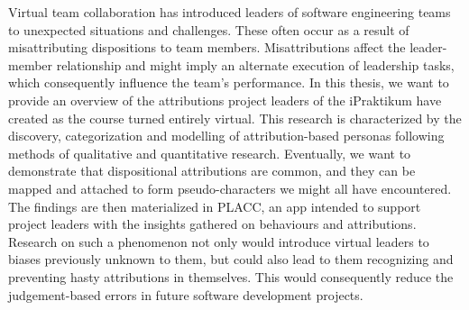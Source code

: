 Virtual team collaboration has introduced leaders of software engineering teams to unexpected situations and challenges.  These often occur as a result of misattributing dispositions to team members.  Misattributions affect the leader-member relationship and might imply an alternate execution of leadership tasks, which consequently influence the team's performance.   In this thesis, we want to provide an overview of the attributions project leaders of the iPraktikum have created as the course turned entirely virtual.   This research is characterized by the discovery, categorization and modelling of attribution-based personas following methods of qualitative and quantitative research. Eventually, we want to demonstrate that dispositional attributions are common, and they can be mapped and attached to form pseudo-characters we might all have encountered.  The findings are then materialized in PLACC,  an app intended to support project leaders with the insights gathered on behaviours and attributions.  Research on such a phenomenon not only would introduce virtual leaders to biases previously unknown to them, but could also lead to them recognizing and preventing hasty attributions in themselves.  This would consequently reduce the judgement-based errors in future software development projects.


